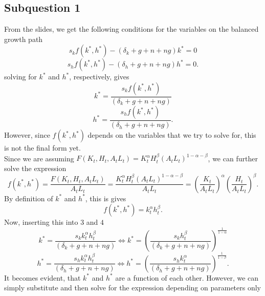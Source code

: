 \documentclass{article}
\begin{document}
\subsection{Subquestion 1}
From the slides, we get the following conditions for the variables on the balanced growth path
\begin{equation}
s_k f\left(k^*,h^*\right)-\left(\delta_k +g+n+ng\right)k^*=0  
\end{equation}
\begin{equation}
s_h f\left(k^*, h^*\right) - \left(\delta_h + g + n + ng\right)h^* = 0.
\end{equation}
solving for $k^*$ and $h^*$, respectively, gives
\begin{equation}
k^*= \frac{s_k f\left(k^*,h^*\right)}{\left(\delta_k +g+n+ng\right)}
\end{equation}
\begin{equation}
h^* = \frac{s_h f\left(k^*,h^*\right)}{\left(\delta_h +g+n+ng\right)}.
\end{equation}
However, since $f\left(k^*,h^*\right)$ depends on the variables that we try to solve for, this is not the final form yet.\\
Since we are assuming $F\left(K_t,H_t,A_tL_t\right) = K_t^\alpha H_t^\beta \left(A_tL_t\right)^{1-\alpha-\beta}$, we can further solve the expression
\begin{equation}
f \left( k^*,h^* \right) = \frac{F \left( K_t,H_t,A_t L_t\right )}{A_t L_t} = \frac{K_t^\alpha H_t^\beta \left(A_tL_t\right)^{1-\alpha-\beta}}{A_t L_t} = \left(\frac{K_t}{A_t L_t}\right)^\alpha \left(\frac{H_t}{A_t L_t}\right)^\beta.
\end{equation}
By definition of $k^*$ and $h^*$, this is gives
\begin{equation}
f\left(k^*,h^*\right) = k_t^\alpha h_t^\beta.
\end{equation}
Now, inserting this into $3$ and $4$
\begin{equation}
k^*= \frac{s_k k_t^\alpha h_t^\beta}{\left(\delta_k +g+n+ng\right)} \Leftrightarrow k^*= \left(\frac{s_k h_t^\beta}{\left(\delta_k +g+n+ng\right)}\right)^{\frac{1}{1-\alpha}}
\end{equation}
\begin{equation}
h^* = \frac{s_h k_t^\alpha h_t^\beta}{\left(\delta_h +g+n+ng\right)} \Leftrightarrow h^*= \left(\frac{s_h k_t^\alpha}{\left(\delta_h +g+n+ng\right)}\right)^{\frac{1}{1-\beta}}.
\end{equation}
It becomes evident, that $k^*$ and $h^*$ are a function of each other. However, we can simply substitute and then solve for the expression depending on parameters only
\end{document}
